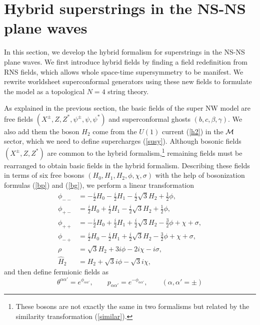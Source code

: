 \documentclass[a4paper,seceq,preprint]{ptptex}
\begin{document}
\section{Hybrid superstrings in the NS-NS plane waves}\label{hyb}

In this section, we develop the hybrid formalism 
for superstrings in the NS-NS plane waves.
We first introduce hybrid fields by finding
a field redefinition from RNS fields, which allows 
whole space-time supersymmetry to be manifest.
We rewrite worldsheet superconformal generators using
these new fields to formulate the model as a topological
$N=4$ string theory.

As explained in the previous section,
the basic fields of the super NW model are free fields 
$(X^\pm,Z,Z^*,\psi^\pm,\psi,\psi^*)$ and superconformal 
ghosts $(b,c,\beta,\gamma)$. We also add them the boson $H_2$ 
come from the $U(1)$ current (\ref{h2}) in the ${\cal M}$ sector,
which we need to define supercharges (\ref{susy}).
Although bosonic fields $(X^\pm,Z,Z^*)$ are common to 
the hybrid formalism,\footnote{
These bosons are not exactly the same in two formalisms
but related by the similarity transformation (\ref{similar}).} 
remaining fields must be rearranged to obtain 
basic fields in the hybrid formalism.
Describing these fields in terms of six free bosons 
$(H_0, H_1, H_2, \phi, \chi, \sigma)$ with the help of 
bosonization formulas (\ref{bp}) and (\ref{bg}), 
we perform a linear transformation
\begin{align}
 \phi_{--}&=-\frac{i}{2}H_0-\frac{i}{2}H_1
-\frac{i}{2}\sqrt{3}H_2+\frac{1}{2}\phi,
\nonumber\\
 \phi_{+-}&=\frac{i}{2}H_0+\frac{i}{2}H_1
-\frac{i}{2}\sqrt{3}H_2+\frac{1}{2}\phi,
\nonumber\\
 \phi_{++}&=-\frac{i}{2}H_0+\frac{i}{2}H_1
+\frac{i}{2}\sqrt{3}H_2-\frac{3}{2}\phi+\chi+\sigma,
\nonumber\\
 \phi_{-+}&=\frac{i}{2}H_0-\frac{i}{2}H_1
+\frac{i}{2}\sqrt{3}H_2-\frac{3}{2}\phi+\chi+\sigma,
\nonumber\\
 \rho&=\sqrt{3}H_2+3i\phi-2i\chi-i\sigma,
\nonumber\\
 \widehat H_2&=H_2+\sqrt{3}i\phi-\sqrt{3}i\chi,
\end{align}
and then define fermionic fields as
\begin{equation}
\theta^{\alpha\alpha'}=e^{\phi_{\alpha\alpha'}},\qquad
p_{\alpha\alpha'}=e^{-\phi_{\alpha\alpha'}},\qquad
(\alpha,\alpha'=\pm)
\label{bo}
\end{equation}
\end{document}
